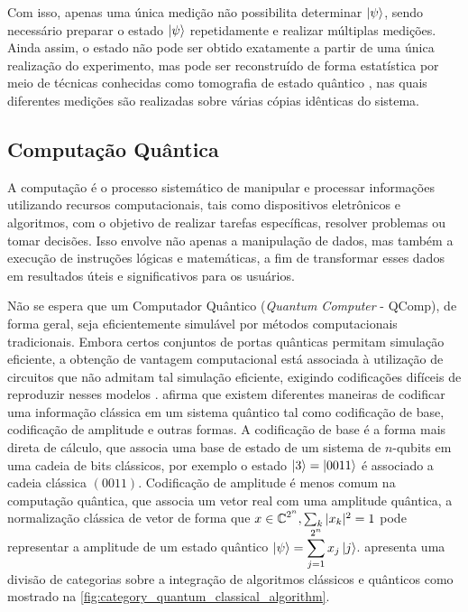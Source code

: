 Com isso, apenas uma única medição não possibilita determinar $\ket{\psi}$, sendo necessário preparar o estado $\ket{\psi}$ repetidamente e realizar múltiplas medições. Ainda assim, o estado não pode ser obtido exatamente a partir de uma única realização do experimento, mas pode ser reconstruído de forma estatística por meio de técnicas conhecidas como tomografia de estado quântico \cite{james2001measurement}, nas quais diferentes medições são realizadas sobre várias cópias idênticas do sistema.

\subsection{Computação Quântica}\label{subsec:quantum_computation}

A computação é o processo sistemático de manipular e processar informações utilizando recursos computacionais, tais como dispositivos eletrônicos e algoritmos, com o objetivo de realizar tarefas específicas, resolver problemas ou tomar decisões. Isso envolve não apenas a manipulação de dados, mas também a execução de instruções lógicas e matemáticas, a fim de transformar esses dados em resultados úteis e significativos para os usuários.

Não se espera que um Computador Quântico (\textit{Quantum Computer} - QComp), de forma geral, seja eficientemente simulável por métodos computacionais tradicionais. Embora certos conjuntos de portas quânticas permitam simulação eficiente, a obtenção de vantagem computacional está associada à utilização de circuitos que não admitam tal simulação eficiente, exigindo codificações difíceis de reproduzir nesses modelos \cite{havlicekSupervisedLearningQuantumenhanced2019}. \textcite{Schuld_Petruccione_2018} afirma que existem diferentes maneiras de codificar uma informação clássica em um sistema quântico tal como codificação de base, codificação de amplitude e outras formas. A codificação de base é a forma mais direta de cálculo, que associa uma base de estado de um sistema de $n$-qubits em uma cadeia de bits clássicos, por exemplo o estado $\ket{3}=\ket{0011}$ é associado a cadeia clássica $(0011)$. Codificação de amplitude é menos comum na computação quântica, que associa um vetor real com uma amplitude quântica, a normalização clássica de vetor de forma que $x\in\operatorname{\mathbb{C}}^{2^n}, \sum_k|x_k|^2=1$ pode representar a  amplitude de um estado quântico $\ket{\psi}=\displaystyle\sum_{j=1}^{2^n}x_j\ket{j}$. \textcite{houssein_machine_2022} apresenta uma divisão de categorias sobre a integração de algoritmos clássicos e quânticos como mostrado na \autoref{fig:category_quantum_classical_algorithm}.


